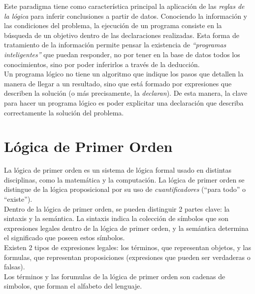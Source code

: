 \documentclass[12pt,titlepage]{article}
\begin{document}
Este paradigma tiene como característica principal la aplicación de las \emph{reglas de la lógica} para inferir conclusiones a partir de datos. Conociendo la información y las condiciones del problema, la ejecución de un programa consiste en la búsqueda de un objetivo dentro de las declaraciones realizadas. Esta forma de tratamiento de la información permite pensar la existencia de \emph{``programas inteligentes''} que puedan responder, no por tener en la base de datos todos los conocimientos, sino por poder inferirlos a través de la deducción.  \\

Un programa lógico no tiene un algoritmo que indique los pasos que detallen la manera de llegar a un resultado, sino que está formado por expresiones que describen la solución (o más precisamente, la \emph{declaran}). De esta manera, la clave para hacer un programa lógico es poder explicitar una declaración que describa correctamente la solución del problema. \\

\newpage

\section{Lógica de Primer Orden}

La lógica de primer orden es un sistema de lógica formal usado en distintas disciplinas, como la matemática y la computación. La lógica de primer orden se distingue de la lógica proposicional por su uso de \emph{cuantificadores} (``para todo'' o ``existe''). \\

Dentro de la lógica de primer orden, se pueden distinguir 2 partes clave: la sintaxis y la semántica. La sintaxis indica la colección de símbolos que son expresiones legales dentro de la lógica de primer orden, y la semántica determina el significado que poseen estos símbolos. \\

Existen 2 tipos de expresiones legales: los términos, que representan objetos, y las formulas, que representan proposiciones (expresiones que pueden ser verdaderas o falsas). \\

Los términos y las forumulas de la lógica de primer orden son cadenas de simbolos, que forman el alfabeto del lenguaje. \\
\end{document}
